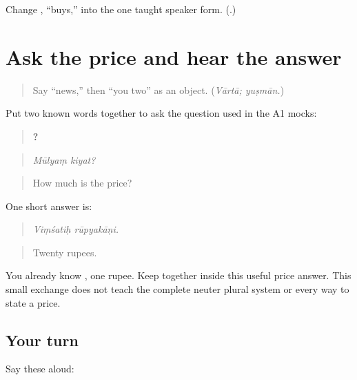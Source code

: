 \begin{tcolorbox}[breakable,colback=teal!4,colframe=teal!35!black,title={Before you move on}]
Change \textbf{}, “buys,” into the one taught speaker form. (\textbf{}.)
\end{tcolorbox}
\section[(ask and hear one price)]{Ask the price and hear the answer}

\label{lesson:SA-C266-ask-and-hear-price}



\begin{quote}
Say “news,” then “you two” as an object. (\emph{Vārtā; yuṣmān.})
\end{quote}

\begin{grammarlens}[title={Grammar Lens: one price turn}]
Put two known words together to ask the question used in the A1 mocks:

\begin{quote}
\textbf{ ?}
\end{quote}

\begin{quote}
\emph{Mūlyaṃ kiyat?}
\end{quote}

\begin{quote}
How much is the price?
\end{quote}

One short answer is:

\begin{quote}
\textbf{ }
\end{quote}

\begin{quote}
\emph{Viṃśatiḥ rūpyakāṇi.}
\end{quote}

\begin{quote}
Twenty rupees.
\end{quote}

You already know \textbf{}, one rupee. Keep \textbf{} together inside this useful price answer. This small exchange does not teach the complete neuter plural system or every way to state a price.
\end{grammarlens}

\subsection*{Your turn}
Say these aloud:

